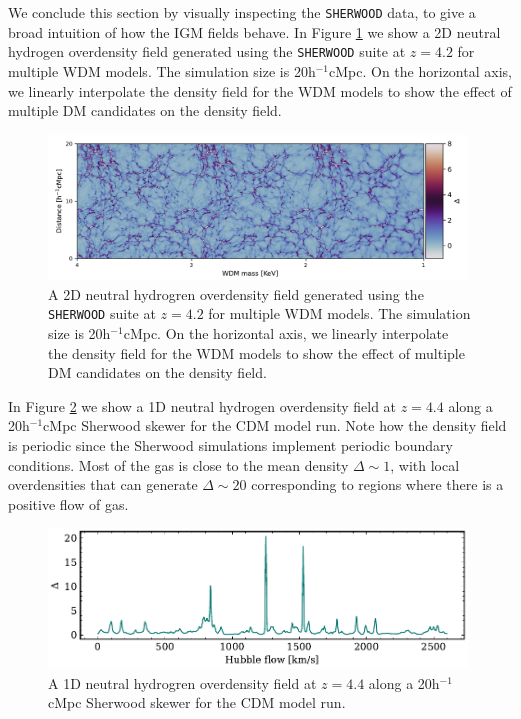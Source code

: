 We conclude this section by visually inspecting the \texttt{SHERWOOD} data, to give a broad intuition of how the IGM fields behave. In Figure \ref{fig: 2D density image} we show a 2D neutral hydrogen overdensity field generated using the \texttt{SHERWOOD} suite at $z=4.2$ for multiple WDM models. The simulation size is 20h$^{-1}$cMpc. On the horizontal axis, we linearly interpolate the density field for the WDM models to show the effect of multiple DM candidates on the density field.
\begin{figure}[ht]
        \centering
        \includegraphics[width=0.99\textwidth]{img/ML/density_image_wdm.pdf}
        \caption{A 2D neutral hydrogren overdensity field generated using the \texttt{SHERWOOD} suite at $z=4.2$ for multiple WDM models. The simulation size is 20h$^{-1}$cMpc. On the horizontal axis, we linearly interpolate the density field for the WDM models to show the effect of multiple DM candidates on the density field.}
        \label{fig: 2D density image}     
\end{figure}
In Figure \ref{fig: 1D density skewer} we show a  1D neutral hydrogen overdensity field at $z=4.4$ along a 20h$^{-1}$cMpc Sherwood skewer for the CDM model run. Note how the density field is periodic since the Sherwood simulations implement periodic boundary conditions. Most of the gas is close to the mean density $\Delta \sim 1$, with local overdensities that can generate $\Delta \sim 20$ corresponding to regions where there is a positive flow of gas.
\begin{figure}
        \centering
        \includegraphics[width=0.99\textwidth]{img/ML/Skewer_density.pdf}
        \caption{A 1D neutral hydrogren overdensity field at $z=4.4$ along a 20h$^{-1}$cMpc Sherwood skewer for the CDM model run.}
        \label{fig: 1D density skewer}     
\end{figure}










